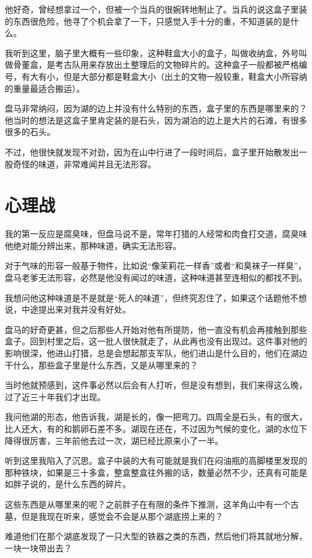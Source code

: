 他好奇，曾经想拿过一个，但被一个当兵的很婉转地制止了。当兵的说这盒子里装的东西很危险，他寻了个机会拿了一下，只感觉入手十分的重，不知道装的是什么。

我听到这里，脑子里大概有一些印象，这种鞋盒大小的盒子，叫做收纳盒，外号叫做骨董盒，是考古队用来存放出土整理后的文物碎片的。这种盒子一般都被严格编号，有大有小，但是大部分都是鞋盒大小（出土的文物一般较重，鞋盒大小所容纳的重量最适合搬运）。

盘马非常纳闷，因为湖的边上并没有什么特别的东西，盒子里的东西是哪里来的？他当时的想法是这盒子里肯定装的是石头，因为湖泊的边上是大片的石滩，有很多很多的石头。

不过，他很快就发现不对劲，因为在山中行进了一段时间后，盒子里开始散发出一股奇怪的味道，非常难闻并且无法形容。

\chapter{心理战}

我的第一反应是腐臭味，但盘马说不是，常年打猎的人经常和肉食打交道，腐臭味他绝对能分辨出来，那种味道，确实无法形容。

对于气味的形容一般基于物件，比如说“像茉莉花一样香”或者“和臭袜子一样臭”，盘马老爹无法形容，必然是他没有闻过的味道，这种味道甚至连相似的都找不到。

我想问他这种味道是不是就是“死人的味道”，但终究忍住了，如果这个话题他不想说，中途提出来对我并没有好处。

盘马的好奇更甚，但之后那些人开始对他有所提防，他一直没有机会再接触到那些盒子。回到村里之后，这一批人很快就走了，从此再也没有出现过。这件事对他的影响很深，他进山打猎，总是会想起那支军队，他们进山是什么目的，他们在湖边干什么，那些盒子里是什么东西，又是从哪里来的？

当时他就预感到，这件事必然以后会有人打听，但是没有想到，我们来得这么晚，过了近三十年我们才出现。

我问他湖的形态，他告诉我，湖是长的，像一把弯刀。四周全是石头，有的很大，比人还大，有的和鹅卵石差不多。湖现在还在，不过因为气候的变化，湖的水位下降得很厉害，三年前他去过一次，湖已经比原来小了一半。

听到这里我陷入了沉思。盒子中装的大有可能就是我们在闷油瓶的高脚楼里发现的那种铁块，如果是三十多盒，整盒整盒往外搬的话，数量必然不少，还真有可能是如胖子说的，是什么东西的碎片。

这些东西是从哪里来的呢？之前胖子在有限的条件下推测，这羊角山中有一个古墓，但是我现在听来，感觉会不会是从那个湖底捞上来的？

难道他们在那个湖底发现了一只大型的铁器之类的东西，然后他们将其就地分解，一块一块带出去？

